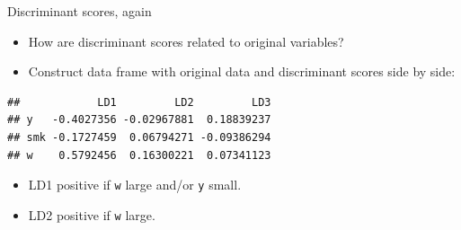 \documentclass[ignorenonframetext,]{beamer}
\newenvironment{Shaded}{\begin{snugshade}}{\end{snugshade}}
\newcommand{\DecValTok}[1]{\textcolor[rgb]{0.00,0.00,0.81}{#1}}
\newcommand{\FloatTok}[1]{\textcolor[rgb]{0.00,0.00,0.81}{#1}}
\newcommand{\KeywordTok}[1]{\textcolor[rgb]{0.13,0.29,0.53}{\textbf{#1}}}
\newcommand{\NormalTok}[1]{#1}
\newcommand{\OperatorTok}[1]{\textcolor[rgb]{0.81,0.36,0.00}{\textbf{#1}}}
\newcommand{\StringTok}[1]{\textcolor[rgb]{0.31,0.60,0.02}{#1}}
\begin{document}
\begin{frame}[fragile]{Discriminant scores, again}
\protect\hypertarget{discriminant-scores-again}{}

\begin{itemize}
\item
  How are discriminant scores related to original variables?
\item
  Construct data frame with original data and discriminant scores side
  by side:
\end{itemize}

\footnotesize

\begin{Shaded}
\end{Shaded}

\begin{verbatim}
##            LD1         LD2         LD3
## y   -0.4027356 -0.02967881  0.18839237
## smk -0.1727459  0.06794271 -0.09386294
## w    0.5792456  0.16300221  0.07341123
\end{verbatim}

\begin{Shaded}
\end{Shaded}

\normalsize

\begin{itemize}
\item
  LD1 positive if \texttt{w} large and/or \texttt{y} small.
\item
  LD2 positive if \texttt{w} large.
\end{itemize}

\end{frame}
\end{document}
